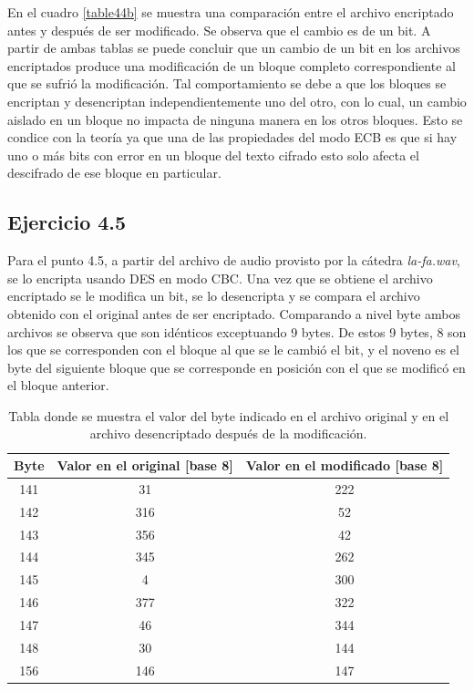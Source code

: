 \documentclass[a4paper,10pt]{article}
\begin{document}
En el cuadro \ref{table44b} se muestra una comparaci\'on entre el archivo encriptado antes y despu\'es de ser modificado. Se observa que
el cambio es de un bit.
A partir de ambas tablas se puede concluir que un cambio de un bit en los archivos encriptados produce una modificaci\'on de un bloque completo
correspondiente al que se sufri\'o la modificaci\'on.
Tal comportamiento se debe a que los bloques se encriptan y desencriptan independientemente uno del otro, con lo cual, un cambio aislado en un bloque
no impacta de ninguna manera en los otros bloques. Esto se condice con la teor\'ia ya que una de las propiedades del
modo ECB es que si hay uno o m\'as bits con error en un bloque del texto cifrado esto solo afecta el descifrado de 
ese bloque en particular.

\subsection{Ejercicio 4.5}
Para el punto 4.5, a partir del archivo de audio provisto por la c\'atedra \emph{la-fa.wav}, se lo encripta usando DES
en modo CBC. Una vez que se obtiene el archivo encriptado se le modifica un bit, se lo desencripta y 
se compara el archivo obtenido con el original antes de ser encriptado.
Comparando a nivel byte ambos archivos se observa que son id\'enticos exceptuando 9 bytes. De estos 9 bytes,
8 son los que se corresponden con el bloque al que se le cambi\'o el bit, y el noveno es el byte del siguiente
bloque que se corresponde en posici\'on con el que se modific\'o en el bloque anterior.
\begin{table}
\begin{center}
\begin{tabular}{|c|c|c|}
\hline
Byte & Valor en el original [base 8] & Valor en el modificado [base 8]\\
\hline
\hline
141 & 31 & 222\\
142 & 316 & 52\\
143 & 356 & 42\\
144 & 345 & 262\\
145 & 4 & 300\\
146 & 377 & 322\\
147 & 46 & 344\\
148 & 30 & 144\\
156 & 146 & 147\\
\hline
\end{tabular}
\end{center}
\caption{Tabla donde se muestra el valor del byte indicado en el archivo original y en el archivo desencriptado despu\'es de la modificaci\'on.}
\label{table45a}
\end{table}
\end{document}

